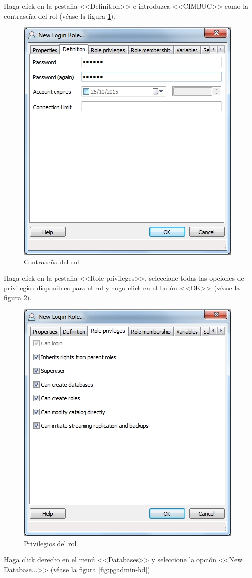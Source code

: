 Haga click en la pesta\~{n}a <<Definition>> e introduzca <<CIMBUC>> como la contrase\~{n}a del rol (v\'{e}ase la figura \ref{fig:pgadmin-rol-clave}).

\begin{figure}[H]
  \centering
  \includegraphics[width=.45\linewidth]{./img/pgadmin-rol-clave.jpg}
\caption[Contrase\~{n}a del rol]{Contrase\~{n}a del rol\label{fig:pgadmin-rol-clave}}
\end{figure}

Haga click en la pesta\~{n}a <<Role privileges>>, seleccione todas las opciones de privilegios disponibles para el rol y haga click en el bot\'{o}n <<OK>> (v\'{e}ase la figura \ref{fig:pgadmin-rol-privilegios}).

\begin{figure}[H]
  \centering
  \includegraphics[width=.45\linewidth]{./img/pgadmin-rol-privilegios.jpg}
\caption[Privilegios del rol]{Privilegios del rol\label{fig:pgadmin-rol-privilegios}}
\end{figure}

\newpage

Haga click derecho en el men\'{u} <<Databases>> y seleccione la opci\'{o}n <<New Database...>> (v\'{e}ase la figura \ref{fig:pgadmin-bd}).


